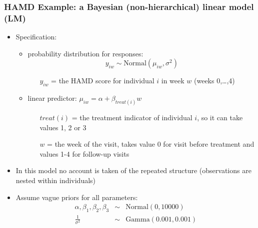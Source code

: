 \documentclass{beamer}
\begin{document}
\begin{frame}
    \frametitle{\large{HAMD Example: a Bayesian (non-hierarchical) linear model (LM)}}
    \begin{itemize}
        \item Specification:\vspace{2mm}
        \begin{itemize}
            \item probability distribution for responses:\vspace{0mm}
                $$y_{iw} \sim \mbox{Normal}(\mu_{iw},\sigma^2)$$\vspace{-4mm}
            \begin{itemize}
                \item[$y_{iw}$ =] the HAMD score for individual $i$ in week $w$ (weeks 0,\ldots,4)\vspace{2mm}
            \end{itemize}
            \item linear predictor:
                $\mu_{iw}=\alpha+\beta_{treat(i)}w$\vspace{2mm}
            \begin{itemize}
                \item[$treat(i)$ =] the treatment indicator of individual $i$, so it can take values 1, 2 or 3\vspace{1mm}
                \item[$w$ =] the week of the visit, takes value 0 for visit before treatment and values 1-4 for follow-up visits\vspace{2mm}
            \end{itemize}
        \end{itemize}
        \item In this model no account is taken of the repeated structure (observations are nested within individuals)\vspace{2mm}
        \item Assume vague priors for all parameters:
            \begin{eqnarray*}
                \alpha, \beta_1, \beta_2, \beta_3  & \sim & \mbox{Normal}(0,10000) \\[2pt]
                \frac{1}{\sigma^2} & \sim & \mbox{Gamma}(0.001,0.001)
            \end{eqnarray*}
    \end{itemize}
\end{frame}
\end{document}
